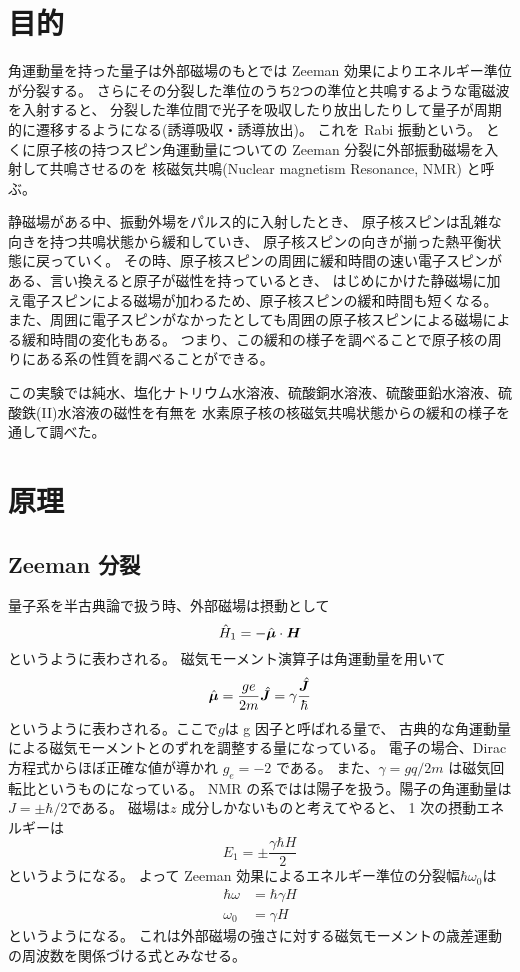 \documentclass[11pt,dvipdfmx,a4paper]{jsarticle}
\begin{document}
\section{目的}
角運動量を持った量子は外部磁場のもとでは Zeeman 効果によりエネルギー準位が分裂する。
さらにその分裂した準位のうち2つの準位と共鳴するような電磁波を入射すると、
分裂した準位間で光子を吸収したり放出したりして量子が周期的に遷移するようになる(誘導吸収・誘導放出)。
これを Rabi 振動という。
とくに原子核の持つスピン角運動量についての Zeeman 分裂に外部振動磁場を入射して共鳴させるのを
核磁気共鳴(Nuclear magnetism Resonance, NMR) と呼ぶ。

静磁場がある中、振動外場をパルス的に入射したとき、
原子核スピンは乱雑な向きを持つ共鳴状態から緩和していき、
原子核スピンの向きが揃った熱平衡状態に戻っていく。
その時、原子核スピンの周囲に緩和時間の速い電子スピンがある、言い換えると原子が磁性を持っているとき、
はじめにかけた静磁場に加え電子スピンによる磁場が加わるため、原子核スピンの緩和時間も短くなる。
また、周囲に電子スピンがなかったとしても周囲の原子核スピンによる磁場による緩和時間の変化もある。
つまり、この緩和の様子を調べることで原子核の周りにある系の性質を調べることができる。

この実験では純水、塩化ナトリウム水溶液、硫酸銅水溶液、硫酸亜鉛水溶液、硫酸鉄(II)水溶液の磁性を有無を
水素原子核の核磁気共鳴状態からの緩和の様子を通して調べた。

\section{原理}
\subsection{Zeeman 分裂}
量子系を半古典論で扱う時、外部磁場は摂動として
\begin{equation}
	\hat{H}_1 = -\hat{\vb*{\mu}}\cdot \vb*{H}
\end{equation}
というように表わされる。
磁気モーメント演算子は角運動量を用いて
\begin{equation}
	\hat{\vb*{\mu}} = \frac{ge}{2m}\hat{\vb*{J}} = \gamma\frac{\hat{\vb*{J}}}{\hbar}
\end{equation}
というように表わされる。ここで\(g\)は g 因子と呼ばれる量で、
古典的な角運動量による磁気モーメントとのずれを調整する量になっている。
電子の場合、Dirac 方程式からほぼ正確な値が導かれ \(g_e = - 2\) である。
また、\(\gamma = gq/2m\) は磁気回転比というものになっている。
NMR の系ではは陽子を扱う。陽子の角運動量は\(J=\pm\hbar/2\)である。
磁場は\(z\) 成分しかないものと考えてやると、 1 次の摂動エネルギーは
\begin{equation}
	E_1 = \pm\frac{\gamma\hbar H}{2}
\end{equation}
というようになる。
よって Zeeman 効果によるエネルギー準位の分裂幅\(\hbar\omega_0\)は
\begin{align}
	\hbar\omega &= \hbar \gamma H\\
	\omega_0 &= \gamma H
\end{align}
というようになる。
これは外部磁場の強さに対する磁気モーメントの歳差運動の周波数を関係づける式とみなせる。 %
\end{document}
